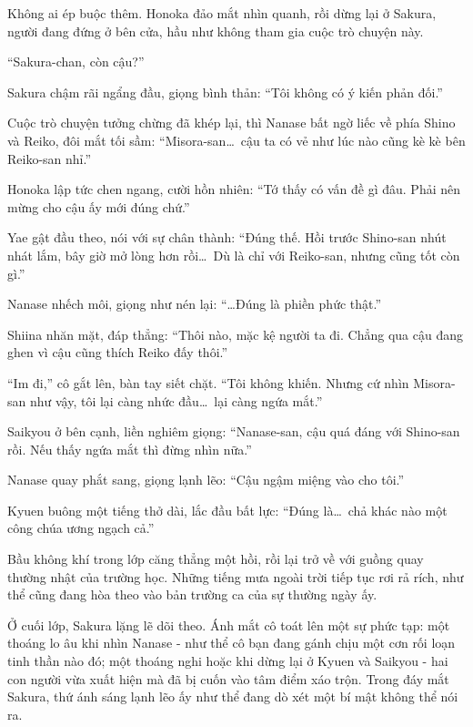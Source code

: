 \documentclass[../main.tex]{subfiles}
\begin{document}
Không ai ép buộc thêm. Honoka đảo mắt nhìn quanh, rồi dừng lại ở Sakura, người đang đứng ở bên cửa, hầu như không tham gia cuộc trò chuyện này.

``Sakura-chan, còn cậu?''

Sakura chậm rãi ngẩng đầu, giọng bình thản: ``Tôi không có ý kiến phản đối.''

Cuộc trò chuyện tưởng chừng đã khép lại, thì Nanase bất ngờ liếc về phía Shino và Reiko, đôi mắt tối sầm: ``Misora-san\dots\ cậu ta có vẻ như lúc nào cũng kè kè bên Reiko-san nhỉ.''


Honoka lập tức chen ngang, cười hồn nhiên: ``Tớ thấy có vấn đề gì đâu. Phải nên mừng cho cậu ấy mới đúng chứ.''

Yae gật đầu theo, nói với sự chân thành: ``Đúng thế. Hồi trước Shino-san nhút nhát lắm, bây giờ mở lòng hơn rồi\dots\ Dù là chỉ với Reiko-san, nhưng cũng tốt còn gì.''

Nanase nhếch môi, giọng như nén lại: ``\dots Đúng là phiền phức thật.''

Shiina nhăn mặt, đáp thẳng: ``Thôi nào, mặc kệ người ta đi. Chẳng qua cậu đang ghen vì cậu cũng thích Reiko đấy thôi.''

``Im đi,'' cô gắt lên, bàn tay siết chặt. ``Tôi không khiến. Nhưng cứ nhìn Misora-san như vậy, tôi lại càng nhức đầu\dots\ lại càng ngứa mắt.''

Saikyou ở bên cạnh, liền nghiêm giọng: ``Nanase-san, cậu quá đáng với Shino-san rồi. Nếu thấy ngứa mắt thì đừng nhìn nữa.''

Nanase quay phắt sang, giọng lạnh lẽo: ``Cậu ngậm miệng vào cho tôi.''

Kyuen buông một tiếng thở dài, lắc đầu bất lực: ``Đúng là\dots\ chả khác nào một công chúa ương ngạch cả.''

Bầu không khí trong lớp căng thẳng một hồi, rồi lại trở về với guồng quay thường nhật của trường học. Những tiếng mưa ngoài trời tiếp tục rơi rả rích, như thể cũng đang hòa theo vào bản trường ca của sự thường ngày ấy.

Ở cuối lớp, Sakura lặng lẽ dõi theo. Ánh mắt cô toát lên một sự phức tạp: một thoáng lo âu khi nhìn Nanase - như thể cô bạn đang gánh chịu một cơn rối loạn tinh thần nào đó; một thoáng nghi hoặc khi dừng lại ở Kyuen và Saikyou - hai con người vừa xuất hiện mà đã bị cuốn vào tâm điểm xáo trộn. Trong đáy mắt Sakura, thứ ánh sáng lạnh lẽo ấy như thể đang dò xét một bí mật không thể nói ra.

\end{document}
